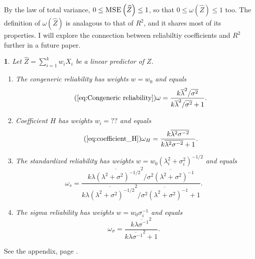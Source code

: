\documentclass{article}
\makeatletter
\theoremstyle{plain}
\theoremstyle{plain}
\theoremstyle{definition}
\theoremstyle{remark}
\theoremstyle{definition}
\theoremstyle{plain}
\theoremstyle{plain}
\newtheorem{prop}[thm]{\protect\propositionname}
\theoremstyle{definition}
\newenvironment{proof}[1][\protect\proofname]{\par
	\normalfont\topsep6\p@\@plus6\p@\relax
	\trivlist
	\itemindent\parindent
	\item[\hskip\labelsep\scshape #1]\ignorespaces
}{%
	\endtrivlist\@endpefalse
}
\providecommand{\proofname}{Proof}
\providecommand{\propositionname}{Proposition}
\makeatother
\begin{document}
By the law of total variance, $0\leq\textsc{MSE}\left(\widehat{Z}\right)\leq1$,
so that $0\leq\omega\left(\widehat{Z}\right)\leq1$ too. The definition
of $\omega(\widehat{Z})$ is analagous to that of $R^{2}$, and it
shares most of its properties. I will explore the connection between
reliabiltiy coefficients and $R^{2}$ further in a future paper.
\begin{prop}
\label{prop:Z-reliabiltiy}Let $\widehat{Z}=\sum_{i=1}^{k}w_{i}X_{i}$ be a linear predictor of $Z$.

\begin{enumerate}[label=(\roman*)]
\item The congeneric reliability has weights $w = w_0$ and equals
\begin{equation}
\tag{\ref{eq:Congeneric reliability}}
\omega=\frac{k\overline{\lambda}^{2}/\overline{\sigma^{2}}}{k\overline{\lambda}^{2}/\overline{\sigma^{2}}+1}.
\end{equation}
\item Coefficient $H$ has weights $w_i = ??$ and equals
\begin{equation}
\tag{\ref{eq:coefficient_H}}
\omega_{H}=\frac{k\overline{\lambda^{2}\sigma^{-2}}}{k\overline{\lambda^{2}\sigma^{-2}}+1}.
\end{equation}
\item The standardized reliability has weights $w=w_{0}(\lambda_{i}^{2}+\sigma_{i}^{2})^{-1/2}$ and equals
\begin{equation}
\omega_s=\frac{k\overline{\lambda(\lambda^{2}+\sigma^{2})^{-1/2}}^{2}/\overline{\sigma^{2}(\lambda^{2}+\sigma^{2})^{-1}}}{k\overline{\lambda(\lambda^{2}+\sigma^{2})^{-1/2}}^{2}/\overline{\sigma^{2}(\lambda^{2}+\sigma^{2})^{-1}}+1}.\label{eq:Standardized reliability}
\end{equation}
\item The sigma reliability has weights $w=w_{0}\sigma_{i}^{-1}$ and equals
\begin{equation}
\omega_\sigma=\frac{k\overline{\lambda\sigma^{-1}}^{2}}{k\overline{\lambda\sigma^{-1}}^{2}+1}.\label{eq:Sigma-standardized reliability}
\end{equation}
\end{enumerate}
\end{prop}
\begin{proof}
See the appendix, page \pageref{proof:Z-reliability}.
\end{proof}
\end{document}
